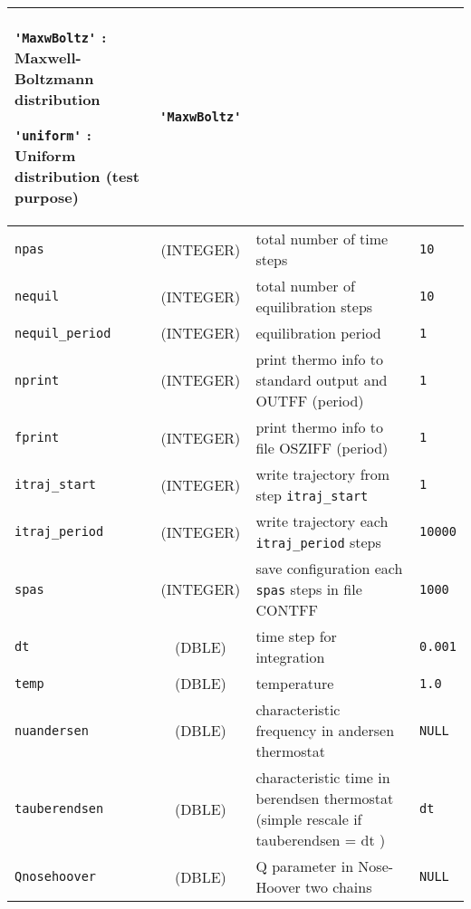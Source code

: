 \documentclass[a4paper]{article}
\begin{document}
\begin{longtable}{l|c|m{8cm}|m{2cm}}
					 \verb?'MaxwBoltz'? : Maxwell-Boltzmann distribution \newline 

					 \verb?'uniform'?   : Uniform distribution (test purpose) \newline                  & \verb?'MaxwBoltz'? \tabularnewline
\hline
\rule[-0.75cm]{0cm}{1.5cm}
\verb?npas?          & (INTEGER)      &  total number of time steps                                                         & \verb?10?    \\
\hline
\rule[-0.75cm]{0cm}{1.5cm}
\verb?nequil?        & (INTEGER)      &  total number of equilibration steps                                                & \verb?10? \\
\hline
\rule[-0.75cm]{0cm}{1.5cm}
\verb?nequil_period? & (INTEGER)      &  equilibration period                                                               & \verb?1? \\
\hline
\rule[-0.75cm]{0cm}{1.5cm}
\verb?nprint?        & (INTEGER)      &  print thermo info to standard output and OUTFF (period)                            & \verb?1? \\
\hline
\rule[-0.75cm]{0cm}{1.5cm}
\verb?fprint?        & (INTEGER)      &  print thermo info to file OSZIFF (period)                                          & \verb?1? \\
\hline
\rule[-0.75cm]{0cm}{1.5cm}
\verb?itraj_start?   & (INTEGER)      &  write trajectory from step \verb?itraj_start?                                      & \verb?1? \\
\hline
\rule[-0.75cm]{0cm}{1.5cm}
\verb?itraj_period?  & (INTEGER)      &  write trajectory each \verb?itraj_period? steps                                    & \verb?10000? \\
\hline
\rule[-0.75cm]{0cm}{1.5cm}
\verb?spas?          & (INTEGER)      &  save configuration each \verb?spas? steps in file CONTFF                           & \verb?1000? \\
\hline
\rule[-0.75cm]{0cm}{1.5cm}
\verb?dt?            & (DBLE)         &  time step for integration                                                          & \verb?0.001? \\
\hline
\rule[-0.75cm]{0cm}{1.5cm}
\verb?temp?          & (DBLE)         &  temperature                                                                        & \verb?1.0?\\
\hline
\rule[-0.75cm]{0cm}{1.5cm}
\verb?nuandersen?    & (DBLE)         &  characteristic frequency in andersen thermostat                                    & \verb?NULL? \\
\hline
\rule[-0.75cm]{0cm}{1.5cm}
\verb?tauberendsen?  & (DBLE)         &  characteristic time in berendsen thermostat (simple rescale if tauberendsen = dt ) & \verb?dt? \\
\hline
\rule[-0.75cm]{0cm}{1.5cm}
\verb?Qnosehoover?   & (DBLE)         &  Q parameter in Nose-Hoover two chains                                              & \verb?NULL? \\
\hline
\hline
\end{longtable}
\end{document}
